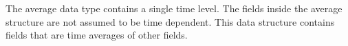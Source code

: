 The average data type contains a single time level. The fields inside the
average structure are not assumed to be time dependent. This data structure
contains fields that are time averages of other fields.
